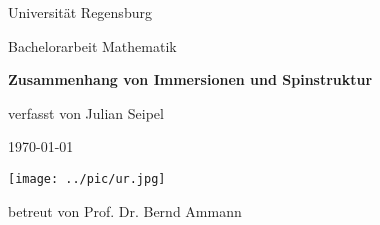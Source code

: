 %
%
%
%
%

	\begin{titlepage}
		\begin{minipage}[c][\textheight][c]{\textwidth}
			\begin{center}
				{Universität Regensburg}
				
				{Bachelorarbeit Mathematik}
				
				\vspace*{0.3cm}
				{ \Huge \textbf{Zusammenhang von Immersionen und Spinstruktur} }
				
				\vspace*{1cm}
				{\Large verfasst von Julian Seipel}

				
				\vspace*{1cm}
				{\Large \today}
				
				\vspace*{4cm}
				\hspace*{1cm} \texttt{[image: ../pic/ur.jpg]}
				
				\vfill
				{\Large betreut von Prof. Dr. Bernd Ammann}
			\end{center}
		\end{minipage}
	\end{titlepage}